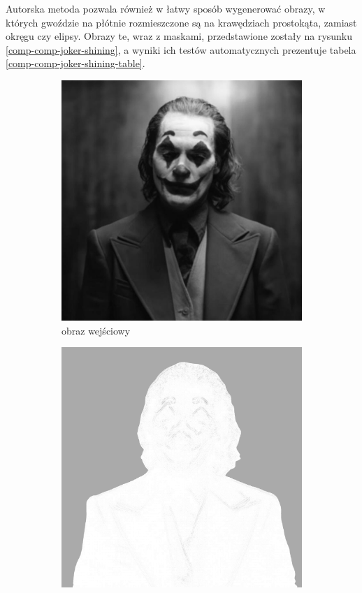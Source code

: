 	Autorska metoda pozwala również w łatwy sposób wygenerować obrazy, w których gwoździe na płótnie rozmieszczone są na krawędziach prostokąta, zamiast okręgu czy elipsy. Obrazy te, wraz z maskami, przedstawione zostały na rysunku \ref{comp-comp-joker-shining}, a wyniki ich testów automatycznych prezentuje tabela \ref{comp-comp-joker-shining-table}.
	\begin{figure}[H] 
    \centering
    \begin{subfigure}{0.32\textwidth}
        \centering
        \includegraphics[width = \textwidth]{img/6-comp/joker_original_c10_inv0.png}
        \caption{obraz wejściowy}
        \label{comp-comp-joker-shining-a}
    \end{subfigure}
    \begin{subfigure}{0.32\textwidth}
        \centering
        \includegraphics[width = \textwidth]{img/6-comp/joker_mask_c20_inv0_bg10_obj5_ed5.png}

\end{subfigure}
\end{figure}
